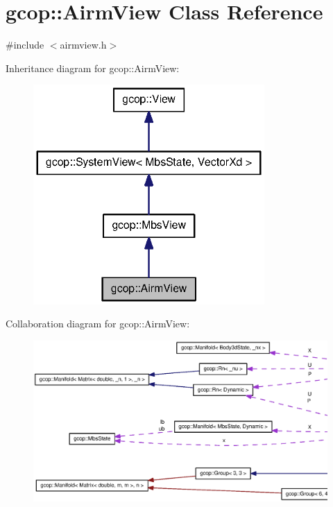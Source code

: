 \section{gcop\-:\-:\-Airm\-View \-Class \-Reference}
\label{classgcop_1_1AirmView}


{\ttfamily \#include $<$airmview.\-h$>$}



\-Inheritance diagram for gcop\-:\-:\-Airm\-View\-:\nopagebreak
\begin{figure}[H]
\begin{center}
\leavevmode
\includegraphics[width=250pt]{classgcop_1_1AirmView__inherit__graph}
\end{center}
\end{figure}


\-Collaboration diagram for gcop\-:\-:\-Airm\-View\-:\nopagebreak
\begin{figure}[H]
\begin{center}
\leavevmode
\includegraphics[width=350pt]{classgcop_1_1AirmView__coll__graph}
\end{center}
\end{figure}
